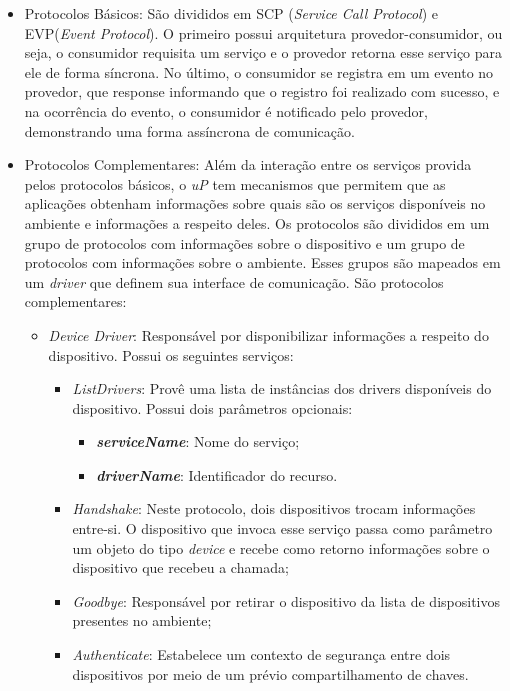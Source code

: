 \begin{itemize}
	\item Protocolos Básicos: São divididos em SCP (\emph{Service Call Protocol}) e EVP(\emph{Event Protocol}). O primeiro possui arquitetura provedor-consumidor, ou seja, o consumidor requisita um serviço e o provedor retorna esse serviço para ele de forma síncrona. No último, o consumidor se registra em um evento no provedor, que response informando que o registro foi realizado com sucesso, e na ocorrência do evento, o consumidor é notificado pelo provedor, demonstrando uma forma assíncrona de comunicação.
	\item Protocolos Complementares: Além da interação entre os serviços provida pelos protocolos básicos, o \emph{uP} tem mecanismos que permitem que as aplicações obtenham informações sobre quais são os serviços disponíveis no ambiente e informações a respeito deles. Os protocolos são divididos em um grupo de protocolos com informações sobre o dispositivo e um grupo de protocolos com informações sobre o ambiente. Esses grupos são mapeados em um \emph{driver} que definem sua interface de comunicação. São protocolos complementares:
	\begin{itemize}
		\item \emph{Device Driver}: Responsável por disponibilizar informações a respeito do dispositivo. Possui os seguintes serviços:
			\begin{itemize}
				\item \emph{ListDrivers}: Provê uma lista de instâncias dos drivers disponíveis do dispositivo. Possui dois parâmetros opcionais:
					\begin{itemize}
						\item \emph{\bf{serviceName}}: Nome do serviço;
						\item \emph{\bf{driverName}}: Identificador do recurso.
					\end{itemize}
				\item \emph{Handshake}: Neste protocolo, dois dispositivos trocam informações entre-si. O dispositivo que invoca esse serviço passa como parâmetro um objeto do tipo \emph{device} e recebe como retorno informações sobre o dispositivo que recebeu a chamada;
				\item \emph{Goodbye}: Responsável por retirar o dispositivo da lista de dispositivos presentes no ambiente;
				\item \emph{Authenticate}: Estabelece um contexto de segurança entre dois dispositivos por meio de um prévio compartilhamento de chaves.
			\end{itemize}

\end{itemize}
\end{itemize}
